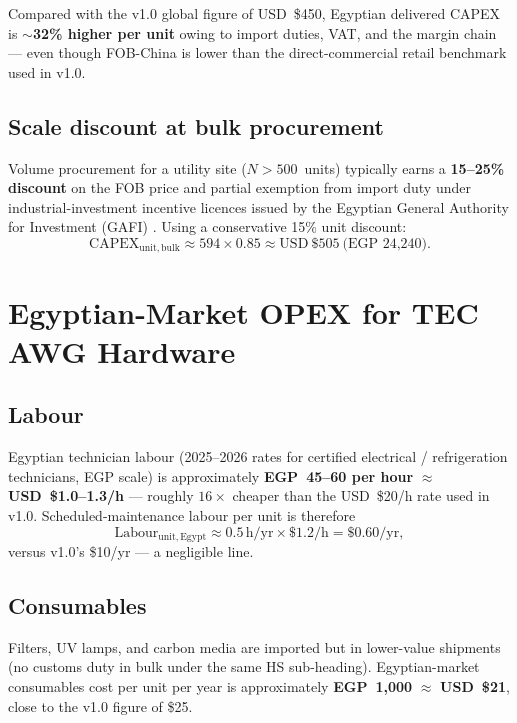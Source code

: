 \documentclass[11pt,a4paper]{article}
\begin{document}
Compared with the v1.0 global figure of USD~\$450, Egyptian delivered CAPEX is \textbf{$\sim$32\% higher per unit} owing to import duties, VAT, and the margin chain --- even though FOB-China is lower than the direct-commercial retail benchmark used in v1.0.

\subsection{Scale discount at bulk procurement}
Volume procurement for a utility site (\mbox{$N>500$ units}) typically earns a \textbf{15--25\% discount} on the FOB price and partial exemption from import duty under industrial-investment incentive licences issued by the Egyptian General Authority for Investment (GAFI) \citep{gafi_incentives_2024}. Using a conservative 15\% unit discount:
\begin{equation}
\mathrm{CAPEX}_{\mathrm{unit,bulk}} \approx 594 \times 0.85 \approx \mathrm{USD}\ \$505\ \text{(EGP~24{,}240)}.
\end{equation}

\section{Egyptian-Market OPEX for TEC AWG Hardware}
\label{sec:egy_opex}

\subsection{Labour}
Egyptian technician labour (2025--2026 rates for certified electrical / refrigeration technicians, EGP scale) is approximately \textbf{EGP~45--60 per hour} $\approx$ \textbf{USD~\$1.0--1.3/h} \citep{capmas_labour_2024,ilo_egypt_wages_2024} --- roughly $16\times$ cheaper than the USD~\$20/h rate used in v1.0. Scheduled-maintenance labour per unit is therefore
\begin{equation}
\mathrm{Labour}_{\mathrm{unit,Egypt}} \approx 0.5\,\mathrm{h/yr}\times \$1.2/\mathrm{h} = \$0.60/\mathrm{yr},
\end{equation}
versus v1.0's \$10/yr --- a negligible line.

\subsection{Consumables}
Filters, UV lamps, and carbon media are imported but in lower-value shipments (no customs duty in bulk under the same HS sub-heading). Egyptian-market consumables cost per unit per year is approximately \textbf{EGP~1{,}000} $\approx$ \textbf{USD~\$21}, close to the v1.0 figure of \$25.
\end{document}
